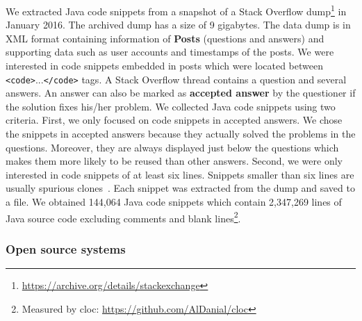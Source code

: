 \documentclass[sigconf,review, anonymous]{acmart}
\begin{document}
We extracted Java code snippets from a snapshot of a Stack Overflow
dump\footnote{\url{https://archive.org/details/stackexchange}} in
January 2016. The archived dump has a size of 9 gigabytes. The data
dump is in XML format containing information of \textbf{Posts}
(questions and answers) and supporting data such as user accounts and
timestamps of the posts. We were interested in code snippets embedded
in posts which were located between
{\small\texttt{<code>}...\texttt{</code>}} tags. A Stack Overflow
thread contains a question and several answers. An answer can also be
marked as \textbf{accepted answer} by the questioner if the solution
fixes his/her problem. We collected Java code snippets using two
criteria. First, we only focused on code snippets in accepted
answers. We chose the snippets in accepted answers because they
actually solved the problems in the questions. Moreover, they are
always displayed just below the questions which makes them more
likely to be reused than other answers. Second, we were only
interested in code snippets of at least six lines. Snippets smaller
than six lines are usually spurious clones~\cite{Bellon2007}. Each
snippet was extracted from the dump and saved to a file.
We obtained 144,064 Java code snippets which contain 2,347,269 lines
of Java source code excluding comments and blank
lines\footnote{Measured by cloc:
  \url{https://github.com/AlDanial/cloc}}.

\subsubsection{Open source systems}
\end{document}
